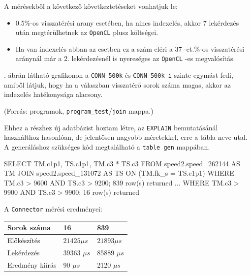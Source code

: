 A mérésekből a következő következtetéseket vonhatjuk le:
\begin{itemize}
	\item 0.5\%-os visszatérési arany esetében, ha nincs indexelés, akkor 7 lekérdezés után megtérülhetnek az \texttt{OpenCL} plusz költségei.
	\item Ha van indexelés abban az esetben ez a szám eléri a 37 -et.\%-os visszatérési aránynál már a 2. lekérdezésnél is nyereséges az \texttt{OpenCL} -es megvalósítás. 
\end{itemize}

. ábrán látható grafikonon a \texttt{CONN 500k} és \texttt{CONN 500k i} szinte egymást fedi, amiből látjuk, hogy ha a válaszban visszatérő sorok száma magas, akkor az indexelés hatékonysága alacsony.

(Forrás: programok, \texttt{program\_test}/\texttt{join} mappa.)

Ehhez a részhez új adatbázist hoztam létre, az \texttt{EXPLAIN} bemutatásánál használthoz hasonlóan, de jelentősen nagyobb méretekkel, erre a tábla neve utal.
A generáláshoz szükséges kód megtalálható a \texttt{table gen} mappában.

\begin{python}
SELECT TM.c1p1, TS.c1p1, TM.c3 * TS.c3
FROM speed2.speed_262144 AS TM 
JOIN speed2.speed_131072 AS TS ON (TM.fk_s = TS.c1p1) 
WHERE TM.c3 > 9600 AND TS.c3 > 9200; 
	839 row(s) returned
...
WHERE TM.c3 > 9900 AND TS.c3 > 9900; 
	16 row(s) returned
\end{python}

A \texttt{Connector} mérési eredményei:

\begin{table}[h!]
\centering
\begin{tabular}{|p{6cm}|p{3cm}|p{3cm}|}
\hline
Sorok száma & 16 & 839 \\
\hline\hline

Előkészítés & $21425 \mu s$ & $21893 \mu s$ \\
\hline

Lekérdezés & 39363 $\mu s$ & 85889 $\mu s$ \\
\hline

Eredmény kiírás & 90 $\mu s$ & 2120 $\mu s$ \\
\hline

\end{tabular}
\end{table}

